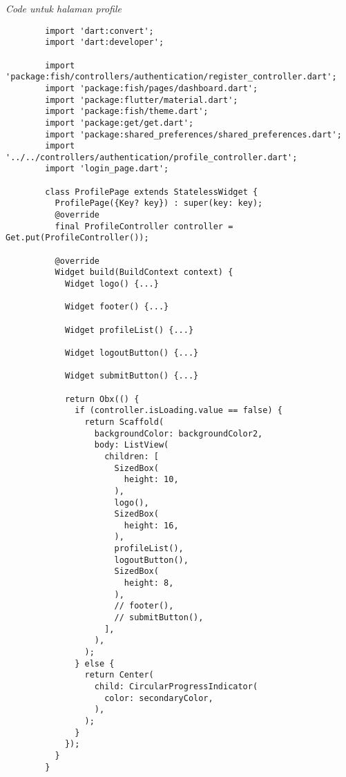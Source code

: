 	\textit{Code untuk halaman profile}
	\begin{lstlisting}
        import 'dart:convert';
        import 'dart:developer';
        
        import 'package:fish/controllers/authentication/register_controller.dart';
        import 'package:fish/pages/dashboard.dart';
        import 'package:flutter/material.dart';
        import 'package:fish/theme.dart';
        import 'package:get/get.dart';
        import 'package:shared_preferences/shared_preferences.dart';
        import '../../controllers/authentication/profile_controller.dart';
        import 'login_page.dart';
        
        class ProfilePage extends StatelessWidget {
          ProfilePage({Key? key}) : super(key: key);
          @override
          final ProfileController controller = Get.put(ProfileController());
        
          @override
          Widget build(BuildContext context) {
            Widget logo() {...}
        
            Widget footer() {...}
        
            Widget profileList() {...}
        
            Widget logoutButton() {...}
        
            Widget submitButton() {...}
        
            return Obx(() {
              if (controller.isLoading.value == false) {
                return Scaffold(
                  backgroundColor: backgroundColor2,
                  body: ListView(
                    children: [
                      SizedBox(
                        height: 10,
                      ),
                      logo(),
                      SizedBox(
                        height: 16,
                      ),
                      profileList(),
                      logoutButton(),
                      SizedBox(
                        height: 8,
                      ),
                      // footer(),
                      // submitButton(),
                    ],
                  ),
                );
              } else {
                return Center(
                  child: CircularProgressIndicator(
                    color: secondaryColor,
                  ),
                );
              }
            });
          }
        }        
	\end{lstlisting}

